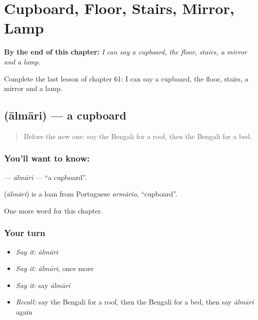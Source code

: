 
\chapter{Cupboard, Floor, Stairs, Mirror, Lamp}
\label{ch:bn-cupboard-floor-stairs-mirror-lamp}

\begin{chapteropening}
\textbf{By the end of this chapter:} \emph{I can say a cupboard, the floor, stairs, a mirror and a lamp.}

Complete the last lesson of chapter 61: I can say a cupboard, the floor, stairs, a mirror and a lamp.
\end{chapteropening}

\section[\texorpdfstring{\bn{আলমারি} (ālmāri)}{আলমারি (ālmāri)}]{ (ālmāri) — a cupboard}

\label{lesson:BN-C61-almari}



\begin{quote}
Before the new one: say the Bengali for a roof, then the Bengali for a bed.
\end{quote}

\subsection*{You'll want to know: }
\textbf{} — \emph{ālmāri} — \textquotedblleft{}a cupboard\textquotedblright{}.

\begin{cousinweb}
\textbf{} (\emph{ālmāri}) is a loan from Portuguese \emph{armário}, \textquotedblleft{}cupboard\textquotedblright{}.
\end{cousinweb}

\begin{grammarlens}[title={What you've built}]
One more word for this chapter.
\end{grammarlens}

\subsection*{Your turn}
\begin{itemize}
\raggedright
  \item \emph{Say it:} \emph{ālmāri}
  \item \emph{Say it:} \emph{ālmāri}, once more
  \item \emph{Say it:} say \emph{ālmāri}
  \item \emph{Recall:} say the Bengali for a roof, then the Bengali for a bed, then say \emph{ālmāri} again
\end{itemize}

